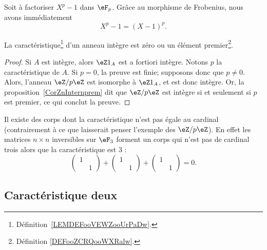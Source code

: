 \begin{example}
	Soit à factoriser \( X^p-1\) dans \( \eF_p\). Grâce au morphisme de Frobenius, nous avons immédiatement
	\begin{equation}
		X^p-1=(X-1)^p.
	\end{equation}
\end{example}


\begin{lemma}       \label{LemCaractIntergernbrcartpre}
	La caractéristique\footnote{Définition~\ref{LEMDEFooVEWZooUrPaDw}.} d'un anneau intègre est zéro ou un élément premier\footnote{Définition \ref{DEFooZCRQooWXRalw}.}.
\end{lemma}

\begin{proof}
	Si \( A\) est intègre, alors \( \eZ 1_A\) est a fortiori intègre. Notons \( p \) la caractéristique de \( A \). Si \( p = 0 \), la preuve est finie; supposons donc que \( p \neq 0 \). Alors, l'anneau \( \eZ/p\eZ\) est isomorphe à \( \eZ 1_A\), et est donc intègre. Or, la proposition~\ref{CorZnInternprem} dit que \( \eZ/p\eZ\) est intègre si et seulement si \( p\) est premier, ce qui conclut la preuve.
\end{proof}

\begin{example}
	Il existe des corps dont la caractéristique n'est pas égale au cardinal (contrairement à ce que laisserait penser l'exemple des \( \eZ/p\eZ\)). En effet les matrices \( n\times n\) inversibles sur \( \eF_{3}\) forment un corps qui n'est pas de cardinal trois alors que la caractéristique est \( 3\) :
	\begin{equation}
		\begin{pmatrix}
			1 &   \\
			  & 1
		\end{pmatrix}+\begin{pmatrix}
			1 &   \\
			  & 1
		\end{pmatrix}+\begin{pmatrix}
			1 &   \\
			  & 1
		\end{pmatrix}=0.
	\end{equation}
\end{example}


\subsection{Caractéristique deux}

